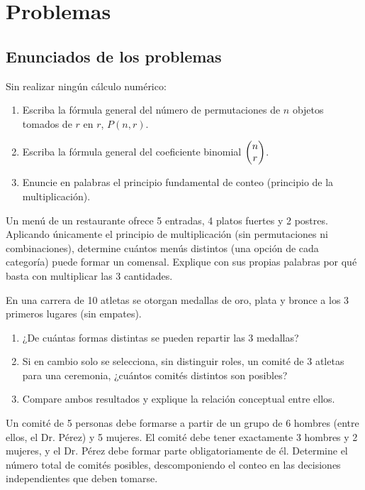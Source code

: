 \section*{Problemas}

\subsection*{Enunciados de los problemas}

\begin{problema}
	\label{prob:6369f2a}
	Sin realizar ningún cálculo numérico:
	\begin{enumerate}
		\item Escriba la fórmula general del número de permutaciones de $n$ objetos tomados de $r$ en $r$, $P(n,r)$.
		\item Escriba la fórmula general del coeficiente binomial $\begin{pmatrix} n \\ r\end{pmatrix}$.
		\item Enuncie en palabras el principio fundamental de conteo (principio de la multiplicación).
	\end{enumerate}
\end{problema}

\begin{problema}
	\label{prob:4f6f981}
	Un menú de un restaurante ofrece 5 entradas, 4 platos fuertes y 2 postres. Aplicando únicamente el principio de multiplicación (sin permutaciones ni combinaciones), determine cuántos menús distintos (una opción de cada categoría) puede formar un comensal. Explique con sus propias palabras por qué basta con multiplicar las 3 cantidades.
\end{problema}

\begin{problema}
	\label{prob:490657c}
	En una carrera de 10 atletas se otorgan medallas de oro, plata y bronce a los 3 primeros lugares (sin empates).
	\begin{enumerate}
		\item ¿De cuántas formas distintas se pueden repartir las 3 medallas?
		\item Si en cambio solo se selecciona, sin distinguir roles, un comité de 3 atletas para una ceremonia, ¿cuántos comités distintos son posibles?
		\item Compare ambos resultados y explique la relación conceptual entre ellos.
	\end{enumerate}
\end{problema}

\begin{problema}
	\label{prob:d8ce0cf}
	Un comité de 5 personas debe formarse a partir de un grupo de 6 hombres (entre ellos, el Dr. Pérez) y 5 mujeres. El comité debe tener exactamente 3 hombres y 2 mujeres, y el Dr. Pérez debe formar parte obligatoriamente de él. Determine el número total de comités posibles, descomponiendo el conteo en las decisiones independientes que deben tomarse.
\end{problema}

